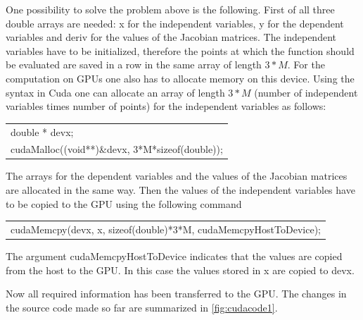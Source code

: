 \documentclass[11pt,twoside]{article}
\begin{document}
One possibility to solve the problem above is the following. First of all
three {\sf double} arrays are needed: {\sf x} for the independent variables, 
{\sf y} for the dependent variables and {\sf deriv} for the values of the 
Jacobian matrices. The independent variables have to be initialized, therefore 
the points at which the function should be evaluated are saved in a row in the 
same array of length $3*M$. For the computation on GPUs one also has to allocate memory
on this device. Using the syntax in Cuda one can allocate an array of 
length $3*M$ (number of independent variables times number of points) for 
the independent variables as follows:
\begin{center}
  \begin{tabular}{l}
    {\sf double * devx;}\\
    {\sf cudaMalloc((void**)\&devx, 3*M*sizeof(double));}\\
  \end{tabular}
\end{center}
The arrays for the dependent variables and the values of the Jacobian matrices
are allocated in the same way. Then the values of the independent variables 
have to be copied to the GPU using the following command
\begin{center}
  \begin{tabular}{l}
    {\sf cudaMemcpy(devx, x, sizeof(double)*3*M, cudaMemcpyHostToDevice);}\\
  \end{tabular}
\end{center}   
The argument {\sf cudaMemcpyHostToDevice} indicates that the values are copied from 
the host to the GPU. In this case the values stored in {\sf x} are copied to {\sf devx}. 

Now all required information has been transferred to the GPU. The changes 
in the source code made so far are summarized in \autoref{fig:cudacode1}.
 
\end{document}

